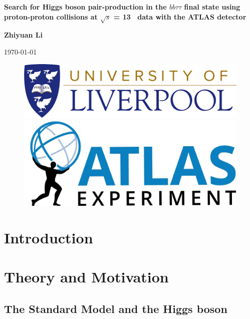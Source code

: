 \documentclass[twoside,11pt]{report}
\newcommand{\changefont}{\fontsize{9}{11}\selectfont}
\begin{document}
\fancyhead{}
\begin{titlepage}
	\centering
	{\LARGE \textbf{Search for Higgs boson pair-production in the $bb\tau\tau$ final state using proton-proton collisions at $\sqrt{s}$ = 13 \TeV\ data with the ATLAS detector} \par}
	\vspace{1cm}
	{\LARGE \textbf{Zhiyuan Li} \par}
	\vspace{0.2cm}
	\today
	\vspace{3cm}
	\begin{figure}[htp]
		\centering
		\includegraphics[width=.5\textwidth]{logo.png}
		\vspace{3em}
		\centering
		\includegraphics[width=.45\textwidth]{ATLAS-Logo-Ref-RGB-H_1.jpg}
		\end{figure}
\end{titlepage}

\tableofcontents{}
\printindex{}

\newpage
{}
\fancyhead[RO,LE]{\changefont }
\fancyhead[RE,LO]{\changefont \leftmark}
\large
\chapter{Introduction}
\chapter{Theory and Motivation}
\section{The Standard Model and the Higgs boson}
\end{document}
